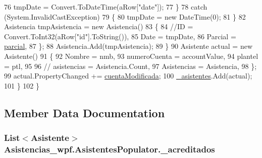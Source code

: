 \begin{DoxyCode}
76                         tmpDate = Convert.ToDateTime(aRow[\textcolor{stringliteral}{"date"}]);
77                     \}
78                     \textcolor{keywordflow}{catch} (System.InvalidCastException)
79                     \{
80                         tmpDate = \textcolor{keyword}{new} DateTime(0);
81                     \}
82                     Asistencia tmpAsistencia = \textcolor{keyword}{new} Asistencia()
83                     \{
84                         \textcolor{comment}{//ID = Convert.ToInt32(aRow["id"].ToString()),}
85                         Date = tmpDate,
86                         Parcial = \hyperlink{class_asistencias__wpf_1_1_asistentes_populator_abe2a5ad9e46aa901e8c8e9bbf03ef653}{parcial},
87                     \};
88                     Asistencia.Add(tmpAsistencia);
89                 \}
90                 Asistente actual = \textcolor{keyword}{new} Asistente()
91                 \{
92                     Nombre = nmb,
93                     numeroCuenta = accountValue,
94                     plantel = ptl,
95 
96                     \textcolor{comment}{// asistencias = Asistencia.Count,}
97                     Asistencias = Asistencia,
98                 \};
99                 actual.PropertyChanged += \hyperlink{class_asistencias__wpf_1_1_asistentes_populator_ae0fd583251f55be398fff227885728e2}{cuentaModificada};
100                 \hyperlink{class_asistencias__wpf_1_1_asistentes_populator_a84a4c12da1ef4556f1cfefbea12902b8}{\_asistentes}.Add(actual);
101             \}
102         \}
\end{DoxyCode}


\subsection{Member Data Documentation}
\hypertarget{class_asistencias__wpf_1_1_asistentes_populator_acb5b7e513ea3e1df015d7fedaa5c2624}{
\subsubsection[{\-\_\-acreditados}]{\setlength{\rightskip}{0pt plus 5cm}List$<${\bf Asistente}$>$ Asistencias\-\_\-wpf.\-Asistentes\-Populator.\-\_\-acreditados\hspace{0.3cm}{\ttfamily [private]}}}\label{class_asistencias__wpf_1_1_asistentes_populator_acb5b7e513ea3e1df015d7fedaa5c2624}


